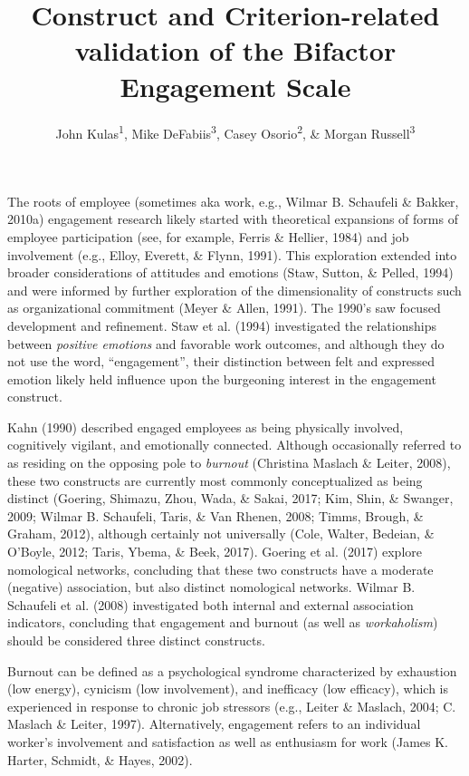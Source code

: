 \documentclass[
  man]{apa6}
\title{Construct and Criterion-related validation of the Bifactor Engagement Scale}
\author{John Kulas\textsuperscript{1}, Mike DeFabiis\textsuperscript{3}, Casey Osorio\textsuperscript{2}, \& Morgan Russell\textsuperscript{3}}
\date{}
\affiliation{\vspace{0.5cm}\textsuperscript{1} eRg\\\textsuperscript{2} Harver\\\textsuperscript{3} Montclair State University}
\begin{document}
\maketitle

The roots of employee (sometimes aka work, e.g., Wilmar B. Schaufeli \& Bakker, 2010a) engagement research likely started with theoretical expansions of forms of employee participation (see, for example, Ferris \& Hellier, 1984) and job involvement (e.g., Elloy, Everett, \& Flynn, 1991). This exploration extended into broader considerations of attitudes and emotions (Staw, Sutton, \& Pelled, 1994) and were informed by further exploration of the dimensionality of constructs such as organizational commitment (Meyer \& Allen, 1991). The 1990's saw focused development and refinement. Staw et al. (1994) investigated the relationships between \emph{positive emotions} and favorable work outcomes, and although they do not use the word, ``engagement'', their distinction between felt and expressed emotion likely held influence upon the burgeoning interest in the engagement construct.

Kahn (1990) described engaged employees as being physically involved, cognitively vigilant, and emotionally connected. Although occasionally referred to as residing on the opposing pole to \emph{burnout} (Christina Maslach \& Leiter, 2008), these two constructs are currently most commonly conceptualized as being distinct (Goering, Shimazu, Zhou, Wada, \& Sakai, 2017; Kim, Shin, \& Swanger, 2009; Wilmar B. Schaufeli, Taris, \& Van Rhenen, 2008; Timms, Brough, \& Graham, 2012), although certainly not universally (Cole, Walter, Bedeian, \& O'Boyle, 2012; Taris, Ybema, \& Beek, 2017). Goering et al. (2017) explore nomological networks, concluding that these two constructs have a moderate (negative) association, but also distinct nomological networks. Wilmar B. Schaufeli et al. (2008) investigated both internal and external association indicators, concluding that engagement and burnout (as well as \emph{workaholism}) should be considered three distinct constructs.

Burnout can be defined as a psychological syndrome characterized by exhaustion (low energy), cynicism (low involvement), and inefficacy (low efficacy), which is experienced in response to chronic job stressors (e.g., Leiter \& Maslach, 2004; C. Maslach \& Leiter, 1997). Alternatively, engagement refers to an individual worker's involvement and satisfaction as well as enthusiasm for work (James K. Harter, Schmidt, \& Hayes, 2002).
\end{document}
